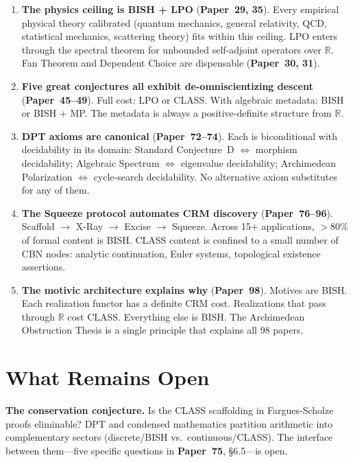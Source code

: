 \documentclass[11pt,twoside,openany]{report}
\theoremstyle{remark}
\newcommand{\BISH}{\textsf{BISH}}
\newcommand{\CLASS}{\textsf{CLASS}}
\newcommand{\paperref}[1]{\textbf{Paper~#1}}
\begin{document}
\begin{enumerate}
  \item \textbf{The physics ceiling is \BISH{} + LPO} (\paperref{29, 35}). Every empirical physical theory calibrated (quantum mechanics, general relativity, QCD, statistical mechanics, scattering theory) fits within this ceiling. LPO enters through the spectral theorem for unbounded self-adjoint operators over $\mathbb{R}$. Fan Theorem and Dependent Choice are dispensable (\paperref{30, 31}).

  \item \textbf{Five great conjectures all exhibit de-omniscientizing descent} (\paperref{45--49}). Full cost: LPO or \CLASS. With algebraic metadata: \BISH{} or \BISH{} + MP. The metadata is always a positive-definite structure from $\mathbb{R}$.

  \item \textbf{DPT axioms are canonical} (\paperref{72--74}). Each is biconditional with decidability in its domain: Standard Conjecture~D $\Leftrightarrow$ morphism decidability; Algebraic Spectrum $\Leftrightarrow$ eigenvalue decidability; Archimedean Polarization $\Leftrightarrow$ cycle-search decidability. No alternative axiom substitutes for any of them.

  \item \textbf{The Squeeze protocol automates CRM discovery} (\paperref{76--96}). Scaffold $\to$ X-Ray $\to$ Excise $\to$ Squeeze. Across 15+ applications, $>$80\% of formal content is \BISH. \CLASS{} content is confined to a small number of CBN nodes: analytic continuation, Euler systems, topological existence assertions.

  \item \textbf{The motivic architecture explains why} (\paperref{98}). Motives are \BISH. Each realization functor has a definite CRM cost. Realizations that pass through $\mathbb{R}$ cost \CLASS. Everything else is \BISH. The Archimedean Obstruction Thesis is a single principle that explains all 98 papers.
\end{enumerate}


\section{What Remains Open}

\textbf{The conservation conjecture.} Is the \CLASS{} scaffolding in Fargues-Scholze proofs eliminable? DPT and condensed mathematics partition arithmetic into complementary sectors (discrete/\BISH{} vs.\ continuous/\CLASS). The interface between them---five specific questions in \paperref{75}, \S6.5---is open.
\end{document}

